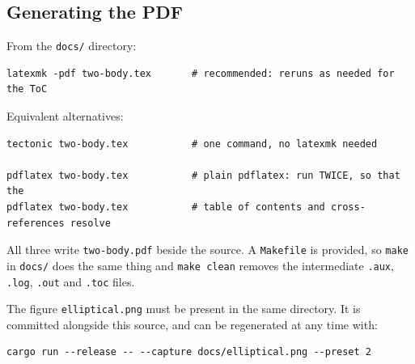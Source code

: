 \documentclass[11pt,a4paper]{article}
\begin{document}
\subsection{Generating the PDF}

From the \texttt{docs/} directory:

\begin{lstlisting}
latexmk -pdf two-body.tex       # recommended: reruns as needed for the ToC
\end{lstlisting}

\noindent Equivalent alternatives:

\begin{lstlisting}
tectonic two-body.tex           # one command, no latexmk needed

pdflatex two-body.tex           # plain pdflatex: run TWICE, so that the
pdflatex two-body.tex           # table of contents and cross-references resolve
\end{lstlisting}

\noindent
All three write \texttt{two-body.pdf} beside the source. A \texttt{Makefile} is
provided, so \texttt{make} in \texttt{docs/} does the same thing and
\texttt{make clean} removes the intermediate \texttt{.aux}, \texttt{.log},
\texttt{.out} and \texttt{.toc} files.

\medskip
\noindent
The figure \texttt{elliptical.png} must be present in the same directory. It is
committed alongside this source, and can be regenerated at any time with:

\begin{lstlisting}
cargo run --release -- --capture docs/elliptical.png --preset 2
\end{lstlisting}
\end{document}
